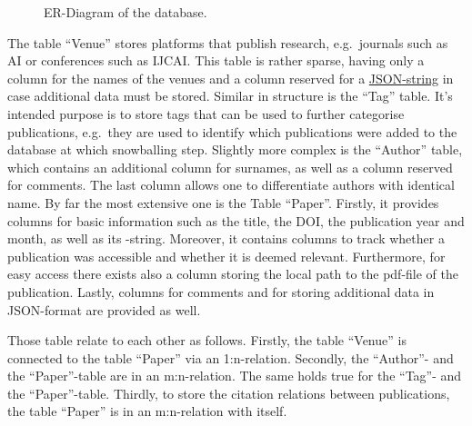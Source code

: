 \documentclass[11pt,a4paper]{book}
\theoremstyle{definition}
\theoremstyle{definition}
\theoremstyle{definition}
\theoremstyle{remark}
\begin{document}
\begin{figure}[h!]
\begin{center}
\end{center}
\caption{ER-Diagram of the database.}
\label{fig:er-diagram-publication-db}
\end{figure}



The table ``Venue'' stores platforms that publish research, e.g.\ journals such as AI or conferences such as IJCAI. This table is rather sparse, having only a column for the names of the venues and a column reserved for a \href{https://www.json.org/json-en.html}{JSON-string} in case additional data must be stored. 
Similar in structure is the ``Tag'' table. It's intended purpose is to store tags that can be used to further categorise publications, e.g.\ they are used to identify which publications were added to the database at which snowballing step.
Slightly more complex is the ``Author'' table, which contains an additional column for surnames, as well as a column reserved for comments. The last column allows one to differentiate authors with identical name. 
By far the most extensive one is the Table ``Paper''. 
Firstly, it provides columns for basic information such as the title, the DOI, the publication year and month, as well as its \BibTeX-string.
Moreover, it contains columns to track whether a publication was accessible and whether it is deemed relevant. 
Furthermore, for easy access there exists also a column storing the local path to the pdf-file of the publication.
Lastly, columns for comments and for storing additional data in JSON-format are provided as well.


Those table relate to each other as follows. 
Firstly, the table ``Venue'' is connected to the table ``Paper'' via an 1:n-relation.
Secondly, the ``Author''- and the ``Paper''-table are in an m:n-relation. The same holds true for the ``Tag''- and the ``Paper''-table.
Thirdly, to store the citation relations between publications, the table ``Paper'' is in an m:n-relation with itself.
\end{document}

